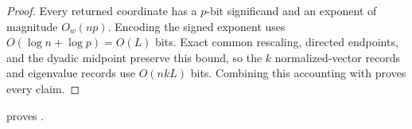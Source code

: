 \documentclass[11pt]{article}
\begin{document}
\begin{proof}
Every returned coordinate has a $p$-bit significand and an exponent of
magnitude $O_w(np)$.  Encoding the signed exponent uses
$O(\log n+\log p)=O(L)$ bits.  Exact common rescaling, directed endpoints,
and the dyadic midpoint preserve this bound, so the $k$ normalized-vector
records and eigenvalue records use $O(nkL)$ bits.  Combining this accounting
with  proves every claim.
\end{proof}

 proves .



\end{document}
